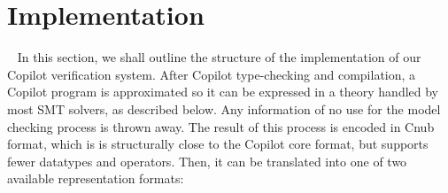 \section{Implementation}~\label{sec:structure} 
%
%
In this section, we shall outline the structure of the implementation
of our Copilot verification system.   %
After Copilot type-checking and compilation, a Copilot program is approximated
so it can be expressed in a theory handled by most SMT solvers, as described below. Any information
of no use for the model checking process is thrown away. The result of this
process is encoded in Cnub format, which is is structurally close to the
Copilot core format, but supports fewer datatypes and operators. Then, it can be
translated into one of two available representation formats:


